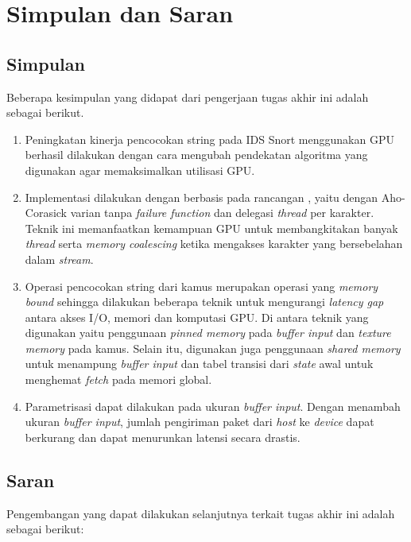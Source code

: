 \chapter{Simpulan dan Saran}

\section{Simpulan}
    Beberapa kesimpulan yang didapat dari pengerjaan tugas akhir ini adalah sebagai berikut.

    \begin{enumerate}

        \item 
        Peningkatan kinerja pencocokan string pada IDS Snort menggunakan GPU berhasil dilakukan dengan cara mengubah pendekatan algoritma yang digunakan agar memaksimalkan utilisasi GPU.

        \item
        Implementasi dilakukan dengan berbasis pada rancangan \cite{lin2013}, yaitu dengan Aho-Corasick varian tanpa \emph{failure function} dan delegasi \emph{thread} per karakter. Teknik ini memanfaatkan kemampuan GPU untuk membangkitakan banyak \emph{thread} serta \emph{memory coalescing} ketika mengakses karakter yang bersebelahan dalam \emph{stream}.
        
        \item 
        Operasi pencocokan string dari kamus merupakan operasi yang \emph{memory bound} sehingga dilakukan beberapa teknik untuk mengurangi \emph{latency gap} antara akses I/O, memori dan komputasi GPU. Di antara teknik yang digunakan yaitu penggunaan \emph{pinned memory} pada \emph{buffer input} dan \emph{texture memory} pada kamus. Selain itu, digunakan juga penggunaan \emph{shared memory} untuk menampung \emph{buffer input} dan tabel transisi dari \emph{state} awal untuk menghemat \emph{fetch} pada memori global.

        \item
        Parametrisasi dapat dilakukan pada ukuran \emph{buffer input}. Dengan menambah ukuran \emph{buffer input}, jumlah pengiriman paket dari \emph{host} ke \emph{device} dapat berkurang dan dapat menurunkan latensi secara drastis.
        
    \end{enumerate}\clearpage

\section{Saran}
    Pengembangan yang dapat dilakukan selanjutnya terkait tugas akhir ini adalah sebagai berikut:

